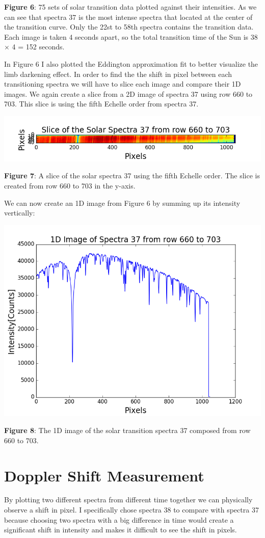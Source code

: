 \documentclass[onecolumn, 12pt, a4paper]{article}
\begin{document}
\textbf{Figure 6}: 75 sets of solar transition data plotted against their intensities. As we can see that spectra 37 is the most intense spectra that located at the center of the transition curve. Only the 22st to 58th spectra contains the transition data. Each image is taken 4 seconds apart, so the total transition time of the Sun is 38 $\times$ 4 = 152 seconds. \newline

In Figure 6 I also plotted the Eddington approximation fit to better visualize the limb darkening effect. In order to find the the shift in pixel between each transitioning spectra we will have to slice each image and compare their 1D images. We again create a slice from a 2D image of spectra 37 using row 660 to 703. This slice is using the fifth Echelle order from spectra 37.  \newline

\centerline{\includegraphics[width=.65\linewidth]{figure_1-6.png}}\newline

\textbf{Figure 7}: A slice of the solar spectra 37 using the fifth Echelle order. The slice is created from row 660 to 703 in the y-axis.
\begin{flushleft}
We can now create an 1D image from Figure 6 by summing up its intensity vertically: \newline
\end{flushleft}
\centerline{\includegraphics[width=.55\linewidth]{figure_1-7.png}}\newline

\textbf{Figure 8}: The 1D image of the solar transition spectra 37 composed from row 660 to 703.

\section{Doppler Shift Measurement}
By plotting two different spectra from different time together we can physically observe a shift in pixel. I specifically chose spectra 38 to compare with spectra 37 because choosing two spectra with a big difference in time would create a significant shift in intensity and makes it difficult to see the shift in pixels. \newline
\end{document}
